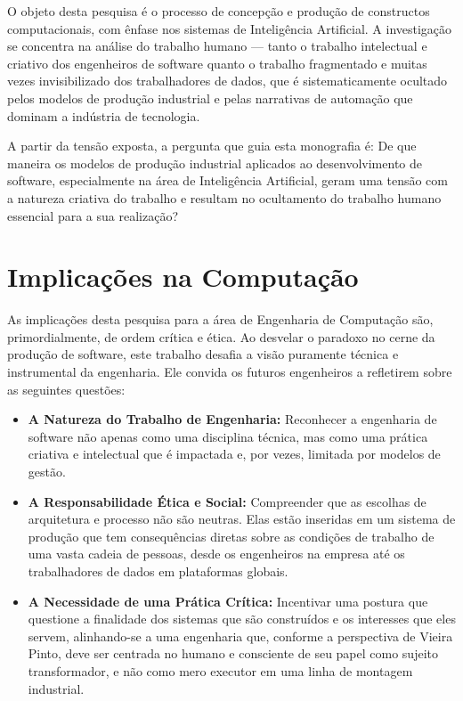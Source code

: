 O objeto desta pesquisa é o processo de concepção e produção de constructos computacionais, com ênfase nos sistemas de Inteligência Artificial. 
A investigação se concentra na 
análise do trabalho humano — tanto o trabalho intelectual e criativo dos engenheiros de software quanto o trabalho fragmentado e muitas vezes invisibilizado dos trabalhadores 
de dados, que é sistematicamente ocultado pelos modelos de produção industrial e pelas narrativas de automação que dominam a indústria de tecnologia. 

A partir da tensão exposta, a pergunta que guia esta monografia é: De que maneira os modelos de produção industrial aplicados ao desenvolvimento de software, especialmente na 
área de Inteligência Artificial, geram uma tensão com a natureza criativa do trabalho e resultam no ocultamento do trabalho humano essencial para a sua realização? 

\section{Implicações na Computação}\label{sec:implicacoes_computacao}

As implicações desta pesquisa para a área de Engenharia de Computação são, primordialmente, de ordem crítica e ética. 
Ao desvelar o paradoxo no cerne da produção de software, 
este trabalho desafia a visão puramente técnica e instrumental da engenharia. 
Ele convida os futuros engenheiros a refletirem sobre as seguintes questões: 

\begin{itemize}
    \item \textbf{A Natureza do Trabalho de Engenharia:} Reconhecer a engenharia de software não apenas como uma disciplina técnica, mas como uma prática criativa e intelectual que é impactada e, 
por vezes, limitada por modelos de gestão.
\item \textbf{A Responsabilidade Ética e Social:} Compreender que as escolhas de arquitetura e processo não são neutras. 
Elas estão inseridas em um sistema de produção que tem consequências 
diretas sobre as condições de trabalho de uma vasta cadeia de pessoas, desde os engenheiros na empresa até os trabalhadores de dados em plataformas globais. 
\item \textbf{A Necessidade de uma Prática Crítica:} Incentivar uma postura que questione a finalidade dos sistemas que são construídos e os interesses que eles servem, alinhando-se a uma 
engenharia que, conforme a perspectiva de Vieira Pinto, deve ser centrada no humano e consciente de seu papel como sujeito transformador, e não como mero executor em uma linha 
de montagem industrial. 
\end{itemize}